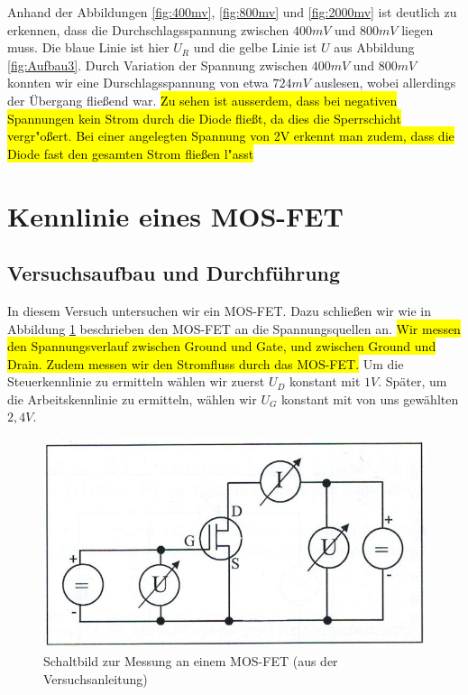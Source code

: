 \documentclass{scrartcl}
\begin{document}
Anhand der Abbildungen \ref{fig:400mv}, \ref{fig:800mv} und \ref{fig:2000mv} ist deutlich zu erkennen, dass die Durchschlagsspannung zwischen $400mV$ und $800mV$ liegen muss. Die blaue Linie ist hier $U_R$ und die gelbe Linie ist $U$ aus Abbildung \ref{fig:Aufbau3}. 
Durch Variation der Spannung zwischen $400mV$ und $800mV$ konnten wir eine Durschlagsspannung von etwa $724mV$ auslesen, wobei allerdings der Übergang fließend war. \hl{Zu sehen ist ausserdem, dass bei negativen Spannungen kein Strom durch die Diode flie\ss{}t, da dies die Sperrschicht vergr"o\ss{}ert. Bei einer angelegten Spannung von 2V erkennt man zudem, dass die Diode fast den gesamten Strom flie\ss{}en l"asst}

\pagebreak
\section{Kennlinie eines MOS-FET}
\subsection{Versuchsaufbau und Durchführung}
In diesem Versuch untersuchen wir ein MOS-FET. Dazu schließen wir wie in Abbildung \ref{fig:Aufbau4} beschrieben den MOS-FET an die Spannungsquellen an. \hl{Wir messen den Spannungsverlauf zwischen Ground und Gate, und zwischen Ground und Drain. Zudem messen wir den Stromfluss durch das MOS-FET. } Um die Steuerkennlinie zu ermitteln wählen wir zuerst $U_D$ konstant mit $1V$. Später, um die Arbeitskennlinie zu ermitteln, wählen wir $U_G$ konstant mit von uns gewählten $2,4V$. 
\begin{figure}[H]
  \centering
    \includegraphics[scale=0.75]{Aufbau4.JPG}
  \caption{Schaltbild zur Messung an einem MOS-FET (aus der Versuchsanleitung)}
  \label{fig:Aufbau4}
\end{figure}
\end{document}
